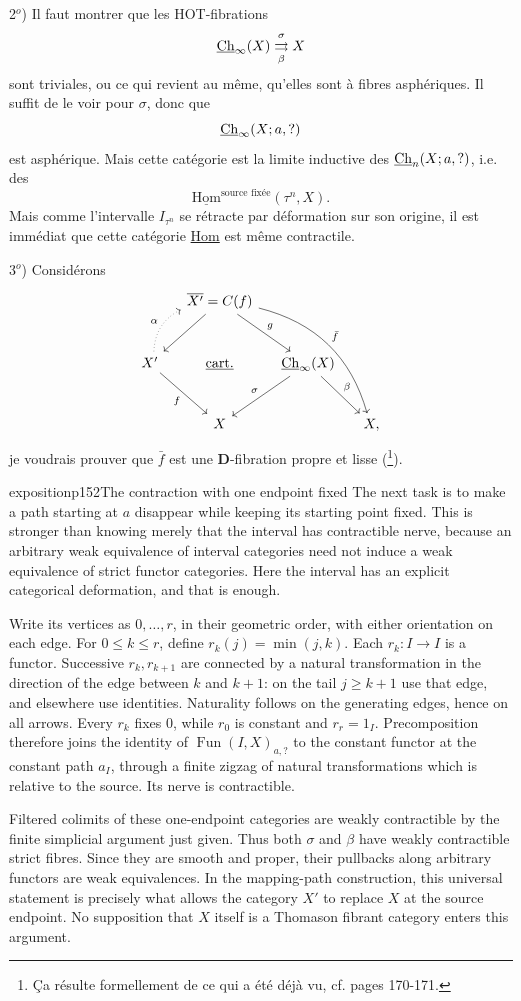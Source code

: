 2$^o$) Il faut montrer que les HOT-fibrations
\[
\underline{\mathrm{Ch}}_\infty(X) \overset{\sigma}{\underset{\beta}{\rightrightarrows}} X
\]
sont triviales, ou ce qui revient au même, qu'elles sont à fibres asphériques. Il suffit de le voir pour $\sigma$, donc que
\[
\underline{\mathrm{Ch}}_\infty(X;a,?)
\]
est asphérique. Mais cette catégorie est la limite inductive des $\underline{\mathrm{Ch}}_n(X;a,?)$, i.e. des
\[
\underline{\mathrm{Hom}}^{\text{source fixée}}(\tau^n, X).
\]
Mais comme l'intervalle $I_{\tau^n}$ se rétracte par déformation sur son origine, il est immédiat que cette catégorie \underline{Hom} est même contractile.

3$^o$) Considérons
\[
\begin{tikzcd}[column sep=small, row sep=large]
 & \Xb = C(f) \arrow[dl] \arrow[dr, "g"] \arrow[ddrr, bend left, "\bar f"] & & \\
X' \arrow[ur, dotted, bend left, "\alpha"] \arrow[dr, "f"'] & \underline{\text{cart.}} & \Ch_\infty(X) \arrow[dl, "\sigma"'] \arrow[dr, "\beta"] & \\
 & X & & X,
\end{tikzcd}
\]
je voudrais prouver que $\bar f$ est une \textbf{D}-fibration propre et lisse (\footnote[38]{Ça résulte formellement de ce qui a été déjà vu, cf. pages 170-171.}).

\begin{dcomment}{exposition}{p152}{The contraction with one endpoint fixed}
The next task is to make a path starting at $a$ disappear while keeping its starting point fixed. This is stronger than knowing merely that the interval has contractible nerve, because an arbitrary weak equivalence of interval categories need not induce a weak equivalence of strict functor categories. Here the interval has an explicit categorical deformation, and that is enough.

Write its vertices as $0,\ldots,r$, in their geometric order, with either orientation on each edge. For $0\leq k\leq r$, define $r_k(j)=\min(j,k)$. Each $r_k:I\to I$ is a functor. Successive $r_k,r_{k+1}$ are connected by a natural transformation in the direction of the edge between $k$ and $k+1$: on the tail $j\geq k+1$ use that edge, and elsewhere use identities. Naturality follows on the generating edges, hence on all arrows. Every $r_k$ fixes $0$, while $r_0$ is constant and $r_r=1_I$. Precomposition therefore joins the identity of $\operatorname{Fun}(I,X)_{a,?}$ to the constant functor at the constant path $a_I$, through a finite zigzag of natural transformations which is relative to the source. Its nerve is contractible.

Filtered colimits of these one-endpoint categories are weakly contractible by the finite simplicial argument just given. Thus both $\sigma$ and $\beta$ have weakly contractible strict fibres. Since they are smooth and proper, their pullbacks along arbitrary functors are weak equivalences. In the mapping-path construction, this universal statement is precisely what allows the category $X'$ to replace $X$ at the source endpoint. No supposition that $X$ itself is a Thomason fibrant category enters this argument.
\end{dcomment}


